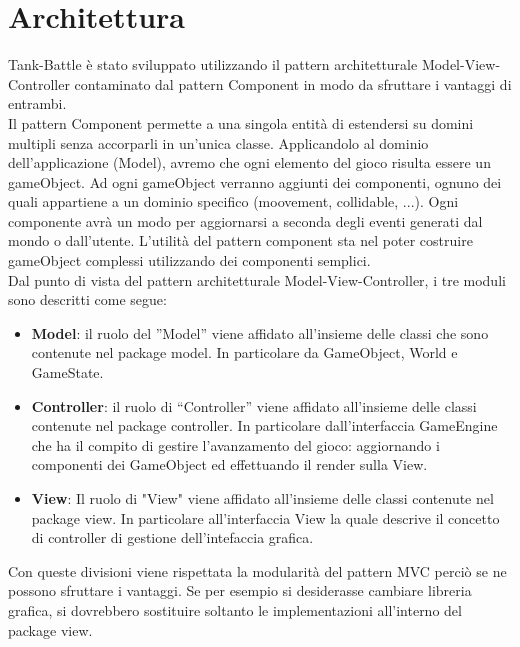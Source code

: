 \documentclass[a4paper,12pt]{report}
\begin{document}
\section{Architettura}
Tank-Battle è stato sviluppato utilizzando il pattern architetturale Model-View-Controller contaminato dal pattern Component in modo da sfruttare i vantaggi di entrambi.\\
Il pattern Component permette a una singola entità di estendersi su domini multipli senza accorparli in un’unica classe. Applicandolo al dominio dell’applicazione (Model), avremo che ogni elemento del gioco risulta essere un gameObject. Ad ogni gameObject verranno aggiunti dei componenti, ognuno dei quali appartiene a un dominio specifico (moovement, collidable, ...). Ogni componente avrà un modo per aggiornarsi a seconda degli eventi generati dal mondo o dall’utente. L'utilità del pattern component sta nel poter costruire gameObject complessi utilizzando dei componenti semplici.\\
Dal punto di vista del pattern architetturale Model-View-Controller, i tre moduli sono descritti come segue: 
\begin{itemize}
	\item \textbf{Model}:
	il ruolo del ”Model” viene affidato all’insieme delle classi che sono contenute nel package model. In particolare da GameObject, World e GameState.
	\item \textbf{Controller}:
	il ruolo di “Controller” viene affidato all’insieme delle classi contenute nel package controller. In particolare dall'interfaccia GameEngine che ha il compito di gestire l’avanzamento del gioco: aggiornando i componenti dei GameObject ed effettuando il render sulla View.
	\item  \textbf{View}:
	Il ruolo di "View" viene affidato all’insieme delle classi contenute nel package view. In particolare all’interfaccia View la quale descrive il concetto di controller di gestione dell'intefaccia grafica.
\end{itemize}
\newpage Con queste divisioni viene rispettata la modularità del pattern MVC perciò se ne possono sfruttare i vantaggi. Se per esempio si desiderasse cambiare libreria grafica, si dovrebbero sostituire soltanto le implementazioni all’interno del package view.
	
\end{document}
